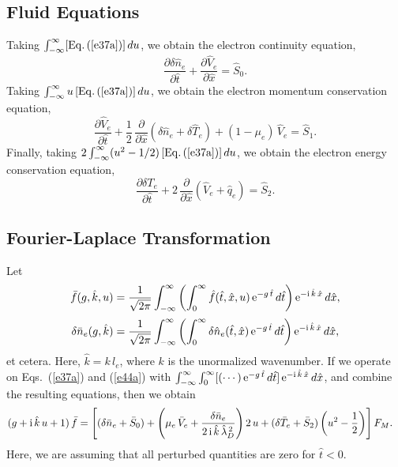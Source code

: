 \documentclass[12pt,prb,aps]{revtex4-1}
\begin{document}
\subsection{Fluid Equations}
Taking $\int_{-\infty}^\infty [{\rm Eq.}\,(\ref{e37a})]\,du$, we obtain the electron continuity equation,
\begin{equation}\label{econt}
\frac{\partial\delta\hat{n}_e}{\partial\hat{t}}+\frac{\partial\hat{V}_e}{\partial\hat{x}} = \hat{S}_0.
\end{equation}
Taking $\int_{-\infty}^\infty u\,[{\rm Eq.}\,(\ref{e37a})]\,du$, we obtain the electron momentum conservation equation, 
\begin{equation}\label{eforce}
\frac{\partial\hat{V}_e}{\partial\hat{t}}+\frac{1}{2}\,\frac{\partial}{\partial\hat{x}}(\delta\hat{n}_e+\delta\hat{T}_e) + (1-\mu_e)\,\hat{V}_e = \hat{S}_1.
\end{equation}
Finally, taking $2\int_{-\infty}^\infty (u^2-1/2)\,[{\rm Eq.}\,(\ref{e37a})]\,du$, we obtain
 the electron  energy conservation equation,
\begin{equation}\label{eenergy}
\frac{\partial\delta T_e}{\partial\hat{t}} +2\,\frac{\partial}{\partial\hat{x}}(\hat{V}_e+\hat{q}_e)= \hat{S}_2.
\end{equation}

\subsection{Fourier-Laplace Transformation}
Let
\begin{align}
\bar{f}(g,\hat{k},u) &= \frac{1}{\sqrt{2\pi}}\int_{-\infty}^\infty\left(\int_0^\infty \hat{f}(\hat{t},\hat{x},u)\,{\rm e}^{-g\,\hat{t}}\,d\hat{t}\right){\rm e}^{-{\rm i}\,\hat{k}\,\hat{x}}\,d\hat{x},\\[0.5ex]
\delta\bar{n}_e(g,\hat{k}) &=\frac{1}{\sqrt{2\pi}} \int_{-\infty}^\infty\left(\int_0^\infty \delta \hat{n}_e(\hat{t},\hat{x})\,{\rm e}^{-g\,\hat{t}}\,d\hat{t}\right){\rm e}^{-{\rm i}\,\hat{k}\,\hat{x}}\,d\hat{x},
\label{e41x}
\end{align}
et cetera.
Here,
$\hat{k}= k\,l_e$,
where $k$ is the unormalized wavenumber.
If we operate on Eqs.~(\ref{e37a}) and (\ref{e44a}) with $\int_{-\infty}^\infty\int_0^\infty[(\cdots)\,{\rm e}^{-g\,\hat{t}}\,d\hat{t}]\,{\rm e}^{-{\rm i}\,\hat{k}\,\hat{x}}\,d\hat{x}$, 
and combine the
resulting equations, then we obtain
\begin{align}\label{e55x}
(g+{\rm i}\,\hat{k}\,u+1)\,\bar{f}&= \left[(\delta\bar{n}_e+\bar{S}_0)+\left(\mu_e\,\bar{V}_e+\frac{\delta\bar{n}_e}{2\,{\rm i}\,\hat{k}\,\hat{\lambda}_D^{\,2}}\right)2\,u+(\delta\bar{T}_e+\bar{S}_2)\left(u^2-\frac{1}{2}\right)\right] F_M.
\end{align}
Here, we are assuming that all perturbed quantities are zero for $\hat{t}<0$. 
\end{document}
